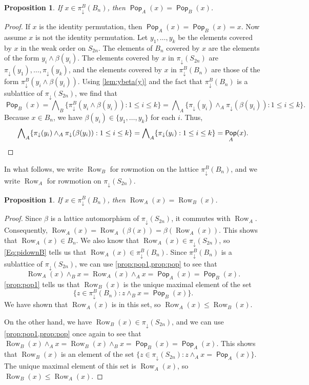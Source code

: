 \documentclass[11pt]{amsart}
\DeclareMathOperator{\Pop}{\mathsf{Pop}}
\newtheorem{proposition}[theorem]{Proposition}
\theoremstyle{definition}
\DeclareMathOperator{\row}{Row}
\begin{document}
\begin{proposition}\label{prop:pop}
    If $x\in \pi_{\downarrow}^B(B_n)$, then $\Pop_{A}(x)=\Pop_{B}(x)$.
\end{proposition}

\begin{proof}
If $x$ is the identity permutation, then $\Pop_{A}(x)=\Pop_{B}(x)=x$. Now assume $x$ is not the identity permutation. Let $y_1,\ldots,y_k$ be the elements covered by $x$ in the weak order on $S_{2n}$. The elements of $B_n$ covered by $x$ are the elements of the form $y_i\wedge\beta(y_i)$. The elements covered by $x$ in $\pi_\downarrow(S_{2n})$ are $\pi_\downarrow(y_1),\ldots,\pi_\downarrow(y_k)$, and the elements covered by $x$ in $\pi_\downarrow^B(B_n)$ are those of the form $\pi_\downarrow^B(y_i\wedge\beta(y_i))$. Using \cref{lem:ybeta(y)} and the fact that $\pi_\downarrow^B(B_n)$ is a sublattice of $\pi_\downarrow(S_{2n})$, we find that 
\[\Pop_{B}(x)=\bigwedge\nolimits_{B}\{\pi_\downarrow^B(y_i\wedge\beta(y_i)):1\leq i \leq k\}=\bigwedge\nolimits_{A}\{\pi_\downarrow(y_i)\wedge_{A}\pi_\downarrow(\beta(y_i)):1\leq i \leq k\}.\] Because $x\in B_n$, we have $\beta(y_i)\in\{y_1,\ldots,y_k\}$ for each $i$. Thus, \[\bigwedge\nolimits_{A}\{\pi_\downarrow(y_i)\wedge_{A}\pi_\downarrow(\beta(y_i)):1\leq i \leq k\}=\bigwedge\nolimits_{A}\{\pi_\downarrow(y_i):1\leq i \leq k\}=\Pop_{A}(x). \qedhere\]
\end{proof}

In what follows, we write $\row_B$ for rowmotion on the lattice $\pi_\downarrow^B(B_n)$, and we write $\row_A$ for rowmotion on $\pi_\downarrow(S_{2n})$. 

\begin{proposition}\label{prop:rowArowB}
    If $x\in\pi_\downarrow^B(B_n)$, then $\row_A(x)=\row_B(x)$. 
\end{proposition}

\begin{proof}
Since $\beta$ is a lattice automorphism of $\pi_\downarrow(S_{2n})$, it commutes with $\row_A$. Consequently,  ${\row_A(x)=\row_A(\beta(x))=\beta(\row_A(x))}$. This shows that $\row_A(x)\in B_n$. We also know that $\row_A(x)\in\pi_\downarrow(S_{2n})$, so \eqref{Eq:pidownB} tells us that $\row_A(x)\in\pi_\downarrow^B(B_n)$. Since $\pi_\downarrow^B(B_n)$ is a sublattice of $\pi_\downarrow(S_{2n})$, we can use \cref{prop:pop1,prop:pop} to see that \[\row_A(x)\wedge_{B}x=\row_A(x)\wedge_{A}x=\Pop_{A}(x)=\Pop_{B}(x).\] \cref{prop:pop1} tells us that $\row_B(x)$ is the unique maximal element of the set \[\{z\in\pi_\downarrow^B(B_n):z\wedge_{B} x=\Pop_{B}(x)\}.\] We have shown that $\row_A(x)$ is in this set, so $\row_A(x)\leq\row_B(x)$. 

On the other hand, we have $\row_B(x)\in\pi_\downarrow(S_{2n})$, and we can use \cref{prop:pop1,prop:pop} once again to see that $\row_B(x)\wedge_{A}x=\row_B(x)\wedge_{B}x=\Pop_{B}(x)=\Pop_{A}(x)$. This shows that $\row_B(x)$ is an element of the set $\{z\in\pi_\downarrow(S_{2n}):z\wedge_{A}x=\Pop_{A}(x)\}$. The unique maximal element of this set is $\row_A(x)$, so $\row_B(x)\leq\row_A(x)$. 
\end{proof}
\end{document}
